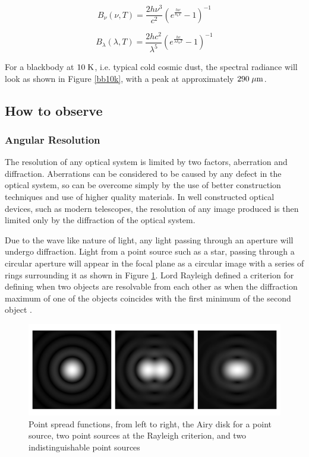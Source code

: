 \begin{equation}
    \label{bbf}
    B_\nu(\nu,T) = \frac{2h\nu^3}{c^2}\left( e^{\frac{h\nu}{k_bT}} - 1\right)^{-1}
\end{equation}

\begin{equation}
    \label{bbw}
    B_\lambda(\lambda,T) = \frac{2hc^2}{\lambda^5}\left( e^{\frac{hc}{\lambda k_bT}} - 1\right)^{-1}
\end{equation}

For a blackbody at $10\;\mathrm{K}$, i.e. typical cold cosmic dust, the spectral radiance will look as shown in Figure \ref{bb10k}, with a peak at approximately $290\;\mathrm{\mu m}$.

\subsection{How to observe}

\subsubsection{Angular Resolution}

The resolution of any optical system is limited by two factors, aberration and diffraction. Aberrations can be considered to be caused by any defect in the optical system, so can be overcome simply by the use of better construction techniques and use of higher quality materials. In well constructed optical devices, such as modern telescopes, the resolution of any image produced is then limited only by the diffraction of the optical system.

Due to the wave like nature of light, any light passing through an aperture will undergo diffraction. Light from a point source such as a star, passing through a circular aperture will appear in the focal plane as a circular image with a series of rings surrounding it as shown in Figure \ref{airy}. Lord Rayleigh defined a criterion for defining when two objects are resolvable from each other as when the diffraction maximum of one of the objects coincides with the first minimum of the second object \citep{rayleigh1880v}.

\begin{figure}[H]
    \centering
    \includegraphics[width=\linewidth]{figures/airy.pdf}
    \caption[Point spread functions]{Point spread functions, from left to right, the Airy disk for a point source, two point sources at the Rayleigh criterion, and two indistinguishable point sources}
    \label{airy}
\end{figure}

